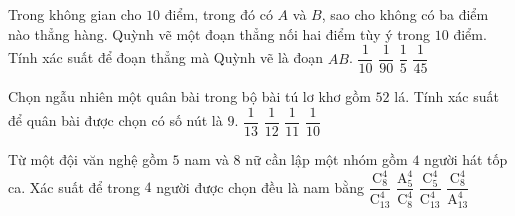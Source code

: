 

\begin{ex}%
	Trong không gian cho $10$ điểm, trong đó có $A$ và $B$,  sao cho không có ba điểm nào thẳng hàng. Quỳnh vẽ một đoạn thẳng nối hai điểm tùy ý trong $10$ điểm. Tính xác suất để đoạn thẳng mà Quỳnh vẽ là đoạn $AB$.
	\choice 
		 {$\dfrac{1}{10}$}
		 {$\dfrac{1}{90}$}
		 {$\dfrac{1}{5}$}
		{\True  $\dfrac{1}{45}$}
\end{ex}

\begin{ex}%
	Chọn ngẫu nhiên một quân bài trong bộ bài tú lơ khơ gồm $52$ lá. Tính xác suất để quân bài  được chọn có số nút là $9$.
	\choice 
		{\True  $\dfrac{1}{13}$}
		 {$\dfrac{1}{12}$}
		 {$\dfrac{1}{11}$}
		{$\dfrac{1}{10}$} 
\end{ex}

\begin{ex}%
	Từ một đội văn nghệ gồm $5$ nam và $8$ nữ cần lập một  nhóm gồm $4$ người hát tốp ca. Xác suất để trong $4$ người được chọn đều là nam bằng
	 \choice
		{$\dfrac{\mathrm{C}_8^4}{\mathrm{C}_{13}^4}$} 
		 {$\dfrac{\mathrm{A}_5^4}{\mathrm{C}_8^4}$}
		{\True $\dfrac{\mathrm{C}_5^4}{\mathrm{C}_{13}^4}$} 
		{$\dfrac{\mathrm{C}_8^4}{\mathrm{A}_{13}^4}$} 
\end{ex}

